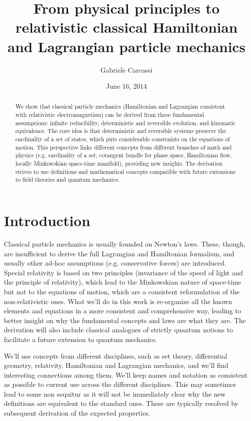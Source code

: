\documentclass[aps,pra,10pt,twocolumn,floatfix,nofootinbib]{revtex4-1}
\theoremstyle{definition}
\begin{document}
\title{From physical principles to relativistic classical Hamiltonian and Lagrangian particle mechanics}
\author{Gabriele Carcassi}
\date{June 16, 2014}

\begin{abstract}
We show that classical particle mechanics (Hamiltonian and Lagrangian consistent with relativistic electromagnetism) can be derived from three fundamental assumptions: infinite reducibility, deterministic and reversible evolution, and kinematic equivalence. The core idea is that deterministic and reversible systems preserve the cardinality of a set of states, which puts considerable constraints on the equations of motion. This perspective links different concepts from different branches of math and physics (e.g. cardinality of a set, cotangent bundle for phase space, Hamiltonian flow, locally Minkowskian space-time manifold), providing new insights. The derivation strives to use definitions and mathematical concepts compatible with future extensions to field theories and quantum mechanics.\end{abstract}
\maketitle

\section{Introduction}

Classical particle mechanics is usually founded on Newton's laws. These, though, are insufficient to derive the full Lagrangian and Hamiltonian formalism, and usually other ad-hoc assumptions (e.g. conservative forces) are introduced. Special relativity is based on two principles (invariance of the speed of light and the principle of relativity), which lead to the Minkowskian nature of space-time but not to the equations of motion, which are a consistent reformulation of the non-relativistic ones. What we'll do in this work is re-organize all the known elements and equations in a more consistent and comprehensive way, leading to better insight on why the fundamental concepts and laws are what they are. The derivation will also include classical analogues of strictly quantum notions to facilitate a future extension to quantum mechanics.

We'll use concepts from different disciplines, such as set theory, differential geometry, relativity, Hamiltonian and Lagrangian mechanics, and we'll find interesting connections among them. We'll keep names and notation as consistent as possible to current use across the different disciplines. This may sometimes lead to some non sequitur as it will not be immediately clear why the new definitions are equivalent to the standard ones. These are typically resolved by subsequent derivation of the expected properties.
\end{document}
